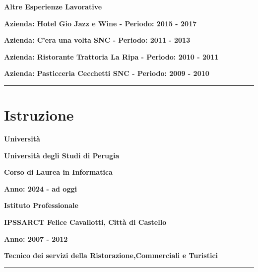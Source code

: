 \documentclass{article}
\newenvironment{listaIdentazione}[1]{
			\begin{list}{}{
			  \setlength{\leftmargin}{#1} %
			  \setlength{\itemsep}{0pt}	%
			  \setlength{\parskip}{0pt} %
			  \setlength{\parsep}{0pt} %
			  \setlength{\labelwidth}{0pt} %
			  \setlength{\labelsep}{0pt} %
			  \renewcommand{\makelabel}[1]{} %
			  }
			}{\end{list}}
\newcommand{\spaziocorto}{\\[0.1cm]}
\newcommand{\spaziolungo}{\\[0.3cm]}
\newcommand{\spaziopiulungo}{\\[0.8cm]}
\begin{document}
\begin{flushleft}
		\textbf{\normalsize{Altre Esperienze Lavorative}}
			\spaziocorto
			\begin{listaIdentazione}{0.5cm}
			\item {\textbf{\normalsize{Azienda: Hotel Gio Jazz e Wine - Periodo: 2015 - 2017}}}
			\spaziocorto
			\item {\textbf{\normalsize{Azienda: C'era una volta SNC - Periodo: 2011 - 2013}}}
			\spaziocorto
			\item {\textbf{\normalsize{Azienda: Ristorante Trattoria La Ripa - Periodo: 2010 - 2011}}}
			\spaziocorto
			\item {\textbf{\normalsize{Azienda: Pasticceria Cecchetti SNC - Periodo: 2009 - 2010}}}
			\spaziopiulungo
			\end{listaIdentazione}

\end{flushleft}

\hrule
\section*{\large{Istruzione}}
\begin{flushleft}
		\textbf{\normalsize{Università}}
		\spaziocorto
			\begin{listaIdentazione}{0.5cm}
			\item{\textbf{\normalsize{Università degli Studi di Perugia}}}
			\spaziocorto
			\item {\textbf{\normalsize{Corso di Laurea in Informatica}}}
			\item {\textbf{\normalsize{Anno: 2024 - ad oggi}}}
			\spaziolungo
			\end{listaIdentazione}
		\textbf{\normalsize{Istituto Professionale}}
		\spaziocorto
			\begin{listaIdentazione}{0.5cm}
			\item{\textbf{\normalsize{IPSSARCT Felice Cavallotti, Città di Castello}}}
			\spaziocorto
			\item \textbf{\normalsize{Anno: 2007 - 2012}}
			\spaziocorto
			\item \textbf{\normalsize{Tecnico dei servizi della Ristorazione,Commerciali e
			Turistici}}
			\spaziocorto
			\end{listaIdentazione}
\end{flushleft}
\hrule
\end{document}
